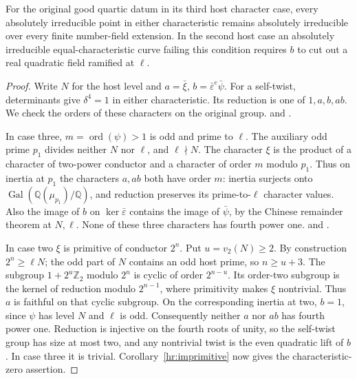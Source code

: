 \begin{proposition}
\label{hr:case3strong}
For the original good quartic datum in its third host character case,
every absolutely irreducible point in either characteristic remains
absolutely irreducible over every finite number-field extension.
In the second host case an absolutely irreducible equal-characteristic
curve failing this condition requires \(b\) to cut out a real
quadratic field ramified at \(\ell\).
\end{proposition}
\begin{proof}
Write \(N\) for the host level and \(a=\bar\xi\),
\(b=\bar\varepsilon^e\bar\psi\). For a self-twist, determinants
give \(\delta^4=1\) in either characteristic. Its reduction is one
of \(1,a,b,ab\). We check the orders of these characters on the
original group.
and .

In case three, \(m=\operatorname{ord}(\psi)>1\) is odd and prime to
\(\ell\). The auxiliary odd prime \(p_1\) divides neither \(N\)
nor \(\ell\), and \(\ell\nmid N\). The character \(\xi\) is the
product of a character of two-power conductor and a character of
order \(m\) modulo \(p_1\). Thus on inertia at \(p_1\) the
characters \(a,ab\) both have order \(m\): inertia surjects
onto \(\operatorname{Gal}(\mathbb Q(\mu_{p_1})/\mathbb Q)\),
and reduction preserves its prime-to-\(\ell\) character values.
Also the image of \(b\) on \(\ker\bar\varepsilon\) contains the
image of \(\bar\psi\), by the Chinese remainder theorem at
\(N,\ell\). None of these three characters has fourth power one.
and .

In case two \(\xi\) is primitive of conductor \(2^n\). Put
\(u=v_2(N)\ge2\). By construction \(2^n\ge\ell N\);
the odd part of \(N\) contains an odd host prime, so \(n\ge u+3\).
The subgroup \(1+2^u\mathbb Z_2\) modulo \(2^n\) is cyclic
of order \(2^{n-u}\). Its order-two subgroup is the kernel of
reduction modulo \(2^{n-1}\), where primitivity makes \(\xi\)
nontrivial. Thus \(a\) is faithful on that cyclic subgroup.
On the corresponding inertia at two, \(b=1\), since \(\psi\)
has level \(N\) and \(\ell\) is odd. Consequently neither
\(a\) nor \(ab\) has fourth power one. Reduction is injective
on the fourth roots of unity, so the self-twist group has size at
most two, and any nontrivial twist is the even quadratic lift of
\(b\). In case three it is trivial. Corollary~\ref{hr:imprimitive}
now gives the characteristic-zero assertion.


\end{proof}
